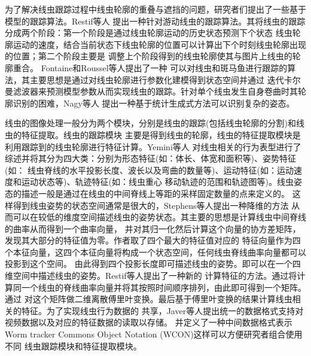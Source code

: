 	为了解决线虫跟踪过程中线虫轮廓的重叠与遮挡的问题，研究者们提出了一些基于模型的跟踪算法。Restif等人\cite{restif2008tracking}
	提出一种针对游动线虫的跟踪算法。其将线虫的跟踪分成两个阶段：第一个阶段是通过线虫轮廓运动的历史状态预测下个状态
	线虫轮廓运动的速度，结合当前状态下线虫轮廓的位置可以计算出下个时刻线虫轮廓出现的位置；第二个阶段主要是
	调整上个阶段得到的线虫轮廓使其与图片上线虫的轮廓重合。 Fontaine和Roussel等人\cite{fontaine2007model,roussel2014robust}提出了一种
	可以对线虫和斑马鱼进行跟踪的算法，其主要思想是通过对线虫轮廓进行参数化建模得到状态空间并通过
	迭代卡尔曼滤波器来预测模型参数从而实现线虫的跟踪。针对单个线虫发生自身卷曲时其轮廓识别的困难，Nagy等人
	\cite{nagy2015generative}提出一种基于统计生成式方法可以识别复杂的姿态。
	
	线虫的图像处理一般分为两个模块，分别是线虫的跟踪(包括线虫轮廓的分割)和线虫的特征提取。线虫的跟踪模块
	主要是得到线虫的轮廓，线虫的特征提取模块是利用跟踪到的线虫轮廓进行特征计算。Yemini等人\cite{yemini2013database}
	对线虫相关的行为表型进行了综述并将其分为四大类：分别为形态特征(如：体长、体宽和面积等)、姿势特征(如：
	线虫脊线的水平投影长度、波长以及弯曲的数量等)、运动特征(如：运动速度和运动状态等)、轨迹特征(如：线虫重心
	移动轨迹的范围和轨迹图等)。线虫姿态的描述一般是通过在线虫的中间脊线上等距的采样固定数量的点来定义的。
	这样得到线虫姿势的状态空间通常是很大的，Stephens等人\cite{Stephens2008Dimensionality}提出一种降维的方法
	从而可以在较低的维度空间描述线虫的姿势状态。其主要的思想是计算线虫中间脊线的曲率从而得到一个曲率向量，
	并对其归一化然后计算这个向量的协方差矩阵，发现其大部分的特征值为零。作者取了四个最大的特征值对应的
	特征向量作为四个本征向量，这四个本征向量将构成一个状态空间，任何线虫脊线曲率向量都可以投影到这个空间。
	由此得到四个投影长度即可描述线虫的姿势。即可以在一个四维空间中描述线虫的姿势。Restif等人\cite{Restif2014CeleST}提出了一种新的
	计算特征的方法。通过将计算同一个线虫的脊线曲率向量并将其按照时间顺序排列，由此即可得到一个矩阵。通过
	对这个矩阵做二维离散傅里叶变换。最后基于傅里叶变换的结果计算线虫相关的特征。为了实现线虫行为数据的
	共享，Javer等人\cite{Javer2018An}提出统一的数据格式支持对视频数据以及对应的特征数据的读取以存储。
	并定义了一种中间数据格式表示Worm tracker Commons Object Notation (WCON)这样可以方便研究者组合使用不同
	线虫跟踪模块和特征提取模块。
